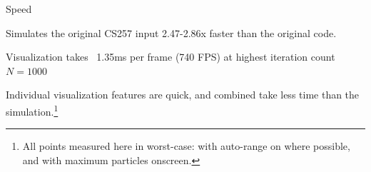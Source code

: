 \begin{frame}{Speed}
    
    \begin{wideitemize}
        \item Simulates the original CS257 input 2.47-2.86x faster than the original code.
        \item Visualization takes ~1.35ms per frame (740 FPS) at highest iteration count $N = 1000$
        \item Individual visualization features are quick, and combined take less time than the simulation.\footnote{All points measured here in worst-case: with auto-range on where possible, and with maximum particles onscreen.}
    \end{wideitemize}
    
    \vfill\null
    
\end{frame}

